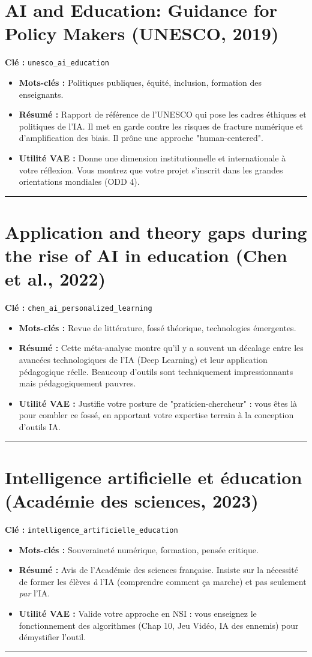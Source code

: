 \section{AI and Education: Guidance for Policy Makers (UNESCO, 2019)}
\textbf{Clé :} \texttt{unesco\_ai\_education}
\begin{itemize}
    \item \textbf{Mots-clés :} Politiques publiques, équité, inclusion, formation des enseignants.
    \item \textbf{Résumé :} Rapport de référence de l'UNESCO qui pose les cadres éthiques et politiques de l'IA. Il met en garde contre les risques de fracture numérique et d'amplification des biais. Il prône une approche "human-centered".
    \item \textbf{Utilité VAE :} Donne une dimension institutionnelle et internationale à votre réflexion. Vous montrez que votre projet s'inscrit dans les grandes orientations mondiales (ODD 4).
\end{itemize}
\hrule

\section{Application and theory gaps during the rise of AI in education (Chen et al., 2022)}
\textbf{Clé :} \texttt{chen\_ai\_personalized\_learning}
\begin{itemize}
    \item \textbf{Mots-clés :} Revue de littérature, fossé théorique, technologies émergentes.
    \item \textbf{Résumé :} Cette méta-analyse montre qu'il y a souvent un décalage entre les avancées technologiques de l'IA (Deep Learning) et leur application pédagogique réelle. Beaucoup d'outils sont techniquement impressionnants mais pédagogiquement pauvres.
    \item \textbf{Utilité VAE :} Justifie votre posture de "praticien-chercheur" : vous êtes là pour combler ce fossé, en apportant votre expertise terrain à la conception d'outils IA.
\end{itemize}
\hrule

\section{Intelligence artificielle et éducation (Académie des sciences, 2023)}
\textbf{Clé :} \texttt{intelligence\_artificielle\_education}
\begin{itemize}
    \item \textbf{Mots-clés :} Souveraineté numérique, formation, pensée critique.
    \item \textbf{Résumé :} Avis de l'Académie des sciences française. Insiste sur la nécessité de former les élèves \textit{à} l'IA (comprendre comment ça marche) et pas seulement \textit{par} l'IA.
    \item \textbf{Utilité VAE :} Valide votre approche en NSI : vous enseignez le fonctionnement des algorithmes (Chap 10, Jeu Vidéo, IA des ennemis) pour démystifier l'outil.
\end{itemize}
\hrule

